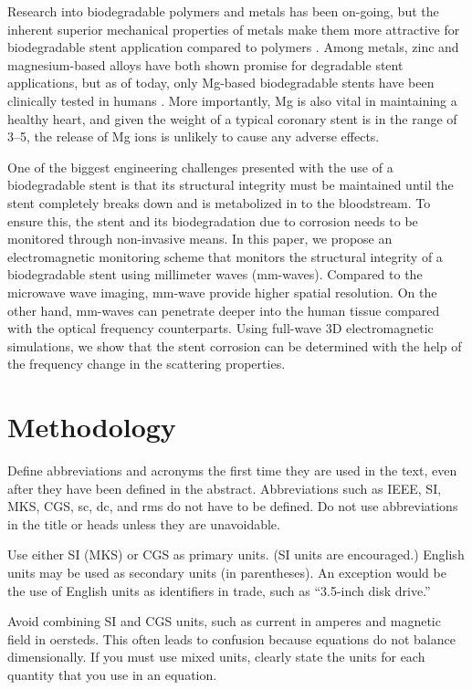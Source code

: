 \documentclass[conference,a4paper]{IEEEtran}
\begin{document}
Research into biodegradable polymers and metals has been on-going, but the inherent superior mechanical properties of metals make them more attractive for biodegradable stent application compared to polymers \cite{chen_recent_2014}. Among metals, zinc and magnesium-based alloys have both shown promise for degradable stent applications, but as of today, only Mg-based biodegradable stents have been clinically tested in humans \cite{staiger_magnesium_2006,esmaily_fundamentals_2017}. More importantly, Mg is also vital in maintaining a healthy heart, and given the weight of a typical coronary stent is in the range of \SIrange{3}{5}{\milligram}, the release of Mg ions is unlikely to cause any adverse effects.

One of the biggest engineering challenges presented with the use of a biodegradable stent is that its structural integrity must be maintained until the stent completely breaks down and is metabolized in to the bloodstream. To ensure this, the stent and its biodegradation due to corrosion needs to be monitored through non-invasive means. In this paper, we propose an electromagnetic monitoring scheme that monitors the structural integrity of a biodegradable stent using millimeter waves (mm-waves). Compared to the microwave wave imaging, mm-wave provide higher spatial resolution. On the other hand, mm-waves can penetrate deeper into the human tissue compared with the optical frequency counterparts. Using full-wave 3D electromagnetic simulations, we show that the stent corrosion can be determined with the help of the frequency change in the scattering properties.

\vspace{7pt}
\section{Methodology}
%

Define abbreviations and acronyms the first time they are used in the text, even after they have been defined in the abstract. Abbreviations such as IEEE, SI, MKS, CGS, sc, dc, and rms do not have to be defined. Do not use abbreviations in the title or heads unless they are unavoidable.

Use either SI (MKS) or CGS as primary units. (SI units are encouraged.) English units may be used as secondary units (in parentheses). An exception would be the use of English units as identifiers in trade, such as “3.5-inch disk drive.”

Avoid combining SI and CGS units, such as current in amperes and magnetic field in oersteds. This often leads to confusion because equations do not balance dimensionally. If you must use mixed units, clearly state the units for each quantity that you use in an equation.
\end{document}
